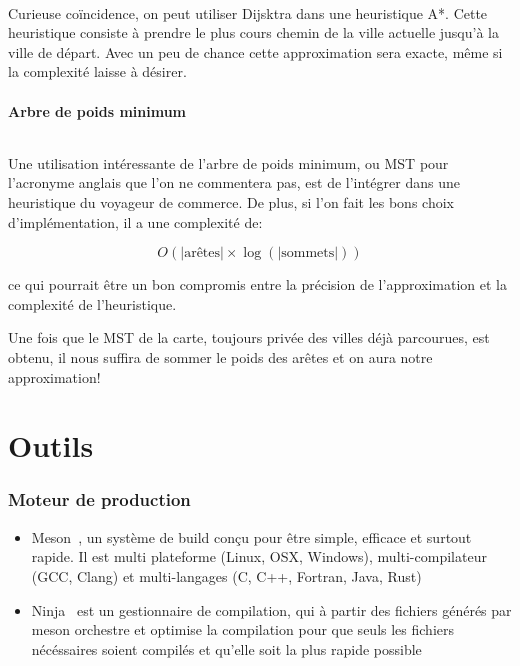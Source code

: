 \documentclass[french]{article}
\begin{document}
\paragraph{} Curieuse coïncidence, on peut utiliser Dijsktra dans une
heuristique A*. Cette heuristique consiste à prendre le plus cours chemin de la
ville actuelle jusqu'à la ville de départ. Avec un peu de chance cette
approximation sera exacte, même si la complexité laisse à désirer.

\subsection{Arbre de poids minimum}

\paragraph{} Une utilisation intéressante de l'arbre de poids minimum, ou MST
pour l'acronyme anglais que l'on ne commentera pas, est de l'intégrer dans une
heuristique du voyageur de commerce. De plus, si l'on fait les bons choix
d'implémentation, il a une complexité de:

\[O(|\text{arêtes}| \times \log\left(|\text{sommets}|\right))\]

ce qui pourrait être un bon compromis entre la précision de l'approximation et
la complexité de l'heuristique.

Une fois que le MST de la carte, toujours privée des villes déjà parcourues,
est obtenu, il nous suffira de sommer le poids des arêtes et on aura notre
approximation!

\part{Outils}

\section{Moteur de production}

\begin{itemize}
	\item Meson~\cite{tools:meson}, un système de build conçu pour être simple, efficace et surtout rapide. Il est multi plateforme (Linux, OSX, Windows), multi-compilateur (GCC, Clang) et multi-langages (C, C++, Fortran, Java, Rust)

	\item Ninja~\cite{tools:ninja} est un gestionnaire de compilation, qui à partir des fichiers générés par meson orchestre et optimise la compilation pour que seuls les fichiers nécéssaires soient compilés et qu'elle soit la plus rapide possible	
\end{itemize}
\end{document}
